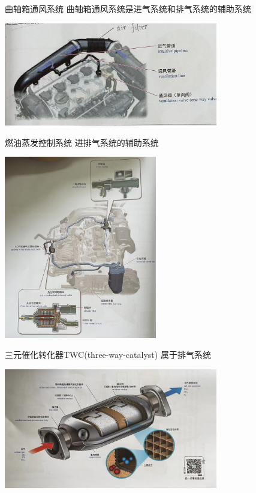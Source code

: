 \begin{frame}
	\begin{block}{曲轴箱通风系统}
		曲轴箱通风系统是进气系统和排气系统的辅助系统
		\begin{center}
			\includegraphics[width=0.7\textwidth]{2-33}
		\end{center}
	\end{block}
\end{frame}
\begin{frame}
	\begin{block}{燃油蒸发控制系统}
		进排气系统的辅助系统
		\begin{center}
			\includegraphics[width=0.5\textwidth]{2-34}
		\end{center}
	\end{block}
\end{frame}
\begin{frame}
	\begin{block}{三元催化转化器TWC(three-way-catalyst)}
		属于排气系统
		\begin{center}
			\includegraphics[width=0.7\textwidth]{2-35}
		\end{center}
	\end{block}
\end{frame}
